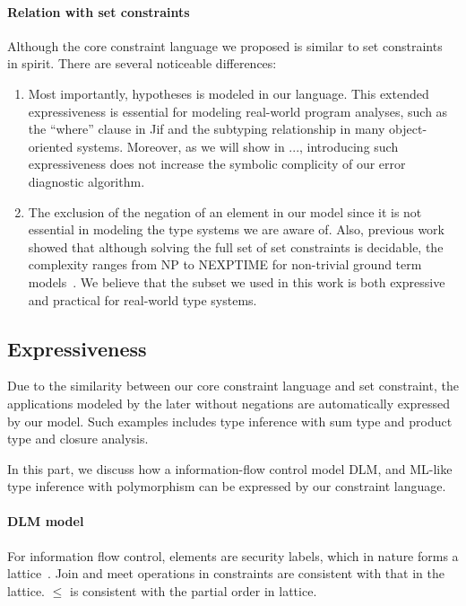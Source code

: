 \paragraph{Relation with set constraints}

Although the core constraint language we proposed is similar to set
constraints~\cite{aiken-setconstraint} in spirit. There are several
noticeable differences:

\begin{enumerate}

\item Most importantly, hypotheses is modeled in our language. This extended
expressiveness is essential for modeling real-world program analyses, such as
the ``where'' clause in Jif and the subtyping relationship in many
object-oriented systems. Moreover, as we will show in ..., introducing such
expressiveness does not increase the symbolic complicity of our error
diagnostic algorithm.

\item The exclusion of the negation of an element in our model since
it is not essential in modeling the type systems we are aware of.
Also, previous work showed that although solving the full set of set
constraints is decidable, the complexity ranges from NP to NEXPTIME
for non-trivial ground term models~\cite{aiken-complexity}. We believe
that the subset we used in this work is both expressive and practical
for real-world type systems.

\end{enumerate}

\subsection{Expressiveness}

Due to the similarity between our core constraint language and set
constraint, the applications modeled by the later without negations
are automatically expressed by our model. Such examples includes type
inference with sum type and product type and closure analysis.

In this part, we discuss how a information-flow control model DLM, and ML-like
type inference with polymorphism can be expressed by our constraint language.

\paragraph{DLM model}

For information flow control, elements are security labels, which in
nature forms a lattice~\cite{denning-lattice}. Join and meet
operations in constraints are consistent with that in the lattice.
$\leq$ is consistent with the partial order in lattice.
 
